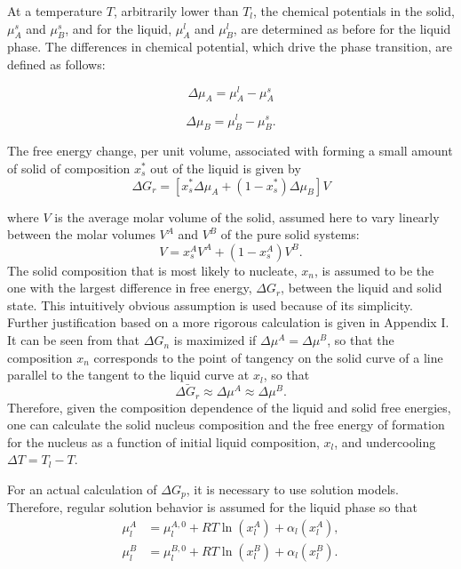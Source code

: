 At a temperature \(T\), arbitrarily lower than \(T_l\), the chemical potentials in the solid, \(\mu_A^s\) and \(\mu_B^s\), and for the liquid, \(\mu_A^l\) and \(\mu_B^l\), are determined as before for the liquid phase. The differences in chemical potential, which drive the phase transition, are defined as follows:

\begin{equation}
\Delta\mu_A = \mu_A^l - \mu_A^s \label{eq:delta_mu_A}
\end{equation} 

\begin{equation}
\Delta\mu_B = \mu_B^l - \mu_B^s. \label{eq:delta_mu_B}
\end{equation} 

The free energy change, per unit volume, associated with forming a small amount of solid of composition \(x_{s}^\ast\) out of the liquid is given by
\begin{equation}
\Delta G_r = [x_s^\ast \Delta\mu_A + (1 - x_s^\ast) \Delta\mu_B]V \label{eq:delta_G_r}
\end{equation} 

where \(V\) is the average molar volume of the solid, assumed here to vary linearly between the molar volumes \(V^A\) and \(V^B\) of the pure solid systems:
\begin{equation}
V = x_s^A V^A + (1 - x_s^A) V^B. \label{eq:V}
\end{equation}
The solid composition that is most likely to nucleate, \(x_n\), is assumed to be the one with the largest difference in free energy, \(\Delta G_r\), between the liquid and solid state. This intuitively obvious assumption is used because of its simplicity. Further justification based on a more rigorous calculation is given in Appendix I. It can be seen from that \(\Delta G_n\) is maximized if \(\Delta \mu^A = \Delta \mu^B\), so that the composition \(x_n\) corresponds to the point of tangency on the solid curve of a line parallel to the tangent to the liquid curve at \(x_l\), so that
\begin{equation}
\bar{\Delta G_r} \approx \Delta \mu^A \approx \Delta \mu^B. \label{eq:bar_delta_G_r}
\end{equation}
Therefore, given the composition dependence of the liquid and solid free energies, one can calculate the solid nucleus composition and the free energy of formation for the nucleus as a function of initial liquid composition, \(x_l\), and undercooling \(\Delta T = T_l - T\).

For an actual calculation of \(\Delta G_p\), it is necessary to use solution models. Therefore, regular solution behavior is assumed for the liquid phase so that
\begin{align}
\mu_l^A &= \mu_l^{A,0} + RT \ln(x_l^A) + \alpha_l(x_l^A), \label{eq:mu_l_A} \\
\mu_l^B &= \mu_l^{B,0} + RT \ln(x_l^B) + \alpha_l(x_l^B). \label{eq:mu_l_B}
\end{align}

